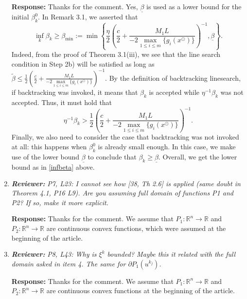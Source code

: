 \documentclass{article}
\def\R{\mathbb{R}}
\begin{document}
\begin{enumerate}
	\textbf{Response:} Thanks for the comment. Yes, $\underline{\beta}$ is used as a lower bound for the initial $\beta_k^0$. In Remark 3.1, we asserted that
\begin{equation}\label{infbeta}
\inf_k \beta_k \ge \beta_{\min}:= \textstyle\min\left\{\frac{\eta}{2}\left(\frac{c}2 + \frac{M_1L}{-2\max\limits_{1 \le i \le m}\{g_i(x^\odot)\}}\right)^{-1},\underline{\beta}\right\}.
\end{equation}
Indeed, from the proof of Theorem 3.1(iii), we see that the line search condition in Step 2b) will be satisfied as long as $\widetilde \beta \le \frac{1}{2}\left(\frac{c}2 + \frac{M_1L}{-2\max\limits_{1 \le i \le m}\{g_i(x^\odot)\}}\right)^{-1}$. By the definition of backtracking linesearch, if backtracking was invoked, it means that $\beta_k$ is accepted while $\eta^{-1}\beta_k$ was not accepted. Thus, it must hold that
\[
\eta^{-1}\beta_k > \frac{1}{2}\left(\frac{c}2 + \frac{M_1L}{-2\max\limits_{1 \le i \le m}\{g_i(x^\odot)\}}\right)^{-1}.
\]
Finally, we also need to consider the case that backtracking was not invoked at all: this happens when $\beta^0_k$ is already small enough. In this case, we make use of the lower bound $\underline{\beta}$ to conclude that $\beta_k \ge \underline{\beta}$. Overall, we get the lower bound as in \eqref{infbeta} above.
%

	\item  \textit{\textbf{Reviewer:}} \textit{P7, L23: I cannot see how [38, Th 2.6] is applied (same doubt in Theorem 4.1, P16 L9). Are you assuming full domain of functions P1 and P2? If so, make it more explicit.}
	
	\textbf{Response:} Thanks for the comment. We assume that $P_1:\R^n\rightarrow\R$ and $P_2:\R^n\rightarrow\R$ are continuous convex functions, which were assumed at the beginning of the article.

	\item  \textit{\textbf{Reviewer:}} \textit{P8, L43: Why is $\xi^k$ bounded? Maybe this it related with the full domain asked in item 4. The same for $\partial P_1(u^{k_j})$.}
	
	\textbf{Response:} Thanks for the comment. We assume that $P_1:\R^n\rightarrow\R$ and $P_2:\R^n\rightarrow\R$ are continuous convex functions at the beginning of the article.


\end{enumerate}
\end{document}
